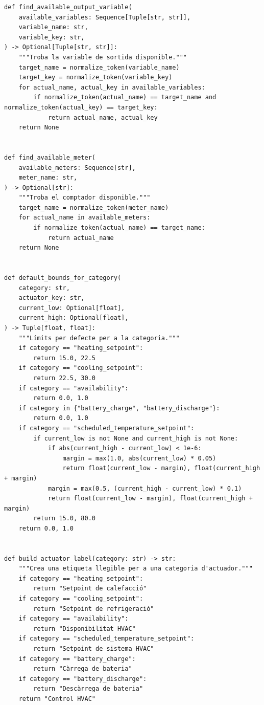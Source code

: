 \documentclass[10pt,a4paper]{article}
\begin{document}
\begin{lstlisting}[style=studioPython,caption={backend/afegir\_entorn\_analysis.py},label={lst:backend-afegir-entorn-analysis-py}]
def find_available_output_variable(
    available_variables: Sequence[Tuple[str, str]],
    variable_name: str,
    variable_key: str,
) -> Optional[Tuple[str, str]]:
    """Troba la variable de sortida disponible."""
    target_name = normalize_token(variable_name)
    target_key = normalize_token(variable_key)
    for actual_name, actual_key in available_variables:
        if normalize_token(actual_name) == target_name and normalize_token(actual_key) == target_key:
            return actual_name, actual_key
    return None


def find_available_meter(
    available_meters: Sequence[str],
    meter_name: str,
) -> Optional[str]:
    """Troba el comptador disponible."""
    target_name = normalize_token(meter_name)
    for actual_name in available_meters:
        if normalize_token(actual_name) == target_name:
            return actual_name
    return None


def default_bounds_for_category(
    category: str,
    actuator_key: str,
    current_low: Optional[float],
    current_high: Optional[float],
) -> Tuple[float, float]:
    """Límits per defecte per a la categoria."""
    if category == "heating_setpoint":
        return 15.0, 22.5
    if category == "cooling_setpoint":
        return 22.5, 30.0
    if category == "availability":
        return 0.0, 1.0
    if category in {"battery_charge", "battery_discharge"}:
        return 0.0, 1.0
    if category == "scheduled_temperature_setpoint":
        if current_low is not None and current_high is not None:
            if abs(current_high - current_low) < 1e-6:
                margin = max(1.0, abs(current_low) * 0.05)
                return float(current_low - margin), float(current_high + margin)
            margin = max(0.5, (current_high - current_low) * 0.1)
            return float(current_low - margin), float(current_high + margin)
        return 15.0, 80.0
    return 0.0, 1.0


def build_actuator_label(category: str) -> str:
    """Crea una etiqueta llegible per a una categoria d'actuador."""
    if category == "heating_setpoint":
        return "Setpoint de calefacció"
    if category == "cooling_setpoint":
        return "Setpoint de refrigeració"
    if category == "availability":
        return "Disponibilitat HVAC"
    if category == "scheduled_temperature_setpoint":
        return "Setpoint de sistema HVAC"
    if category == "battery_charge":
        return "Càrrega de bateria"
    if category == "battery_discharge":
        return "Descàrrega de bateria"
    return "Control HVAC"



\end{lstlisting}
\end{document}

